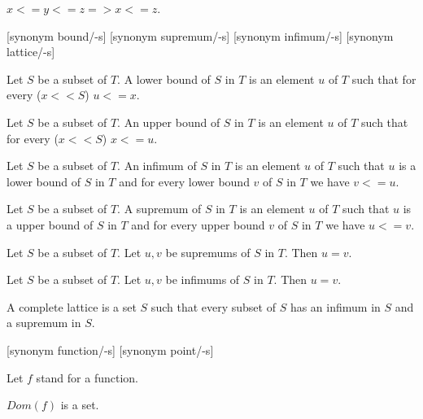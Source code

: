 \documentclass{document}
\begin{document}
\begin{forthel}
    \begin{axiom}[Trans]
      $x <= y <= z => x <= z$.
    \end{axiom}

    [synonym bound/-s] [synonym supremum/-s] [synonym infimum/-s]
    [synonym lattice/-s]

    \begin{definition}[DefLB]
      Let $S$ be a subset of $T$. A lower bound of $S$ in $T$ is an element $u$ of $T$ such that for every ($x << S$) $u <= x$.
    \end{definition}

    \begin{definition}[DefUB]
      Let $S$ be a subset of $T$. An upper bound of $S$ in $T$ is an element $u$ of $T$ such that for every ($x << S$) $x <= u$.
    \end{definition}

    \begin{definition}[DefInf]
      Let $S$ be a subset of $T$. An infimum of $S$ in $T$ is an element $u$ of $T$ such that $u$ is a lower bound of $S$ in $T$ and for every lower bound $v$ of $S$ in $T$ we have $v <= u$.
    \end{definition}

    \begin{definition}[DefSup]
      Let $S$ be a subset of $T$. A supremum of $S$ in $T$ is an element $u$ of $T$ such that $u$ is a upper bound of $S$ in $T$ and for every upper bound $v$ of $S$ in $T$ we have $u <= v$.
    \end{definition}

    \begin{lemma}[SupUn]
      Let $S$ be a subset of $T$. Let $u,v$ be supremums of $S$ in $T$. Then $u = v$.
    \end{lemma}

    \begin{lemma}[InfUn]
      Let $S$ be a subset of $T$. Let $u,v$ be infimums of $S$ in $T$. Then $u = v$.
    \end{lemma}

    \begin{definition}[DefCLat]
      A complete lattice is a set $S$ such that every subset of $S$ has an infimum in $S$ and a supremum in $S$.
    \end{definition}


    [synonym function/-s] [synonym point/-s]


    Let $f$ stand for a function.

    \begin{axiom}
      $Dom(f)$ is a set.
    \end{axiom}


\end{forthel}
\end{document}
